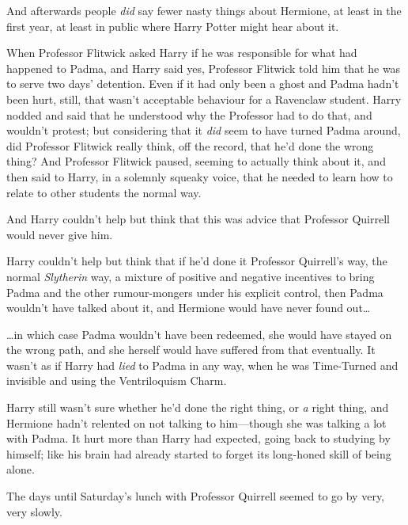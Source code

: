 And afterwards people \emph{did} say fewer nasty things about Hermione, at least in the first year, at least in public where Harry Potter might hear about it.

When Professor Flitwick asked Harry if he was responsible for what had happened to Padma, and Harry said yes, Professor Flitwick told him that he was to serve two days' detention. Even if it had only been a ghost and Padma hadn't been hurt, still, that wasn't acceptable behaviour for a Ravenclaw student. Harry nodded and said that he understood why the Professor had to do that, and wouldn't protest; but considering that it \emph{did} seem to have turned Padma around, did Professor Flitwick really think, off the record, that he'd done the wrong thing? And Professor Flitwick paused, seeming to actually think about it, and then said to Harry, in a solemnly squeaky voice, that he needed to learn how to relate to other students the normal way.

And Harry couldn't help but think that this was advice that Professor Quirrell would never give him.

Harry couldn't help but think that if he'd done it Professor Quirrell's way, the normal \emph{Slytherin} way, a mixture of positive and negative incentives to bring Padma and the other rumour-mongers under his explicit control, then Padma wouldn't have talked about it, and Hermione would have never found out{\ldots}

{\ldots}in which case Padma wouldn't have been redeemed, she would have stayed on the wrong path, and she herself would have suffered from that eventually. It wasn't as if Harry had \emph{lied} to Padma in any way, when he was Time-Turned and invisible and using the Ventriloquism Charm.

Harry still wasn't sure whether he'd done the right thing, or \emph{a} right thing, and Hermione hadn't relented on not talking to him—though she was talking a lot with Padma. It hurt more than Harry had expected, going back to studying by himself; like his brain had already started to forget its long-honed skill of being alone.

The days until Saturday's lunch with Professor Quirrell seemed to go by very, very slowly.

